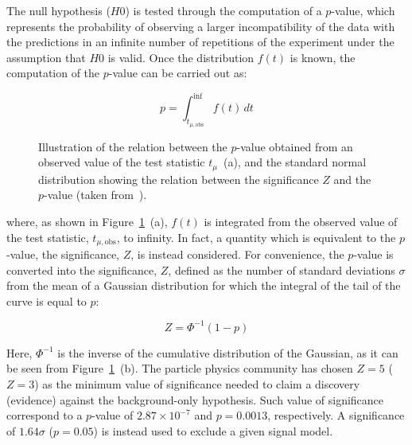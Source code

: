 			The null hypothesis ($H0$) is tested through the computation of a $p$-value, which represents the probability of observing a larger incompatibility of the data with the predictions in an infinite number of repetitions of the experiment under the assumption that $H0$ is valid. Once the distribution $f(t)$ is known, the computation of the $p$-value can be carried out as:

			\begin{equation}
				p = \int_{t_{\mu,\mathrm{obs}}}^{\inf} f(t)\,dt
 			\label{eq:pvalue}
			\end{equation}

			\begin{figure}[!htb]
				\centering
					\hspace{0.05\textwidth}
					\hspace{0.05\textwidth}
				\caption{Illustration of the relation between the $p$-value obtained from an observed value of the test statistic $t_{\mu}$~(a), and the standard normal distribution showing the relation between the significance $Z$ and the $p$-value (taken from~\cite{Cowan:2010js}).}
				\label{fig:pval-sig}
			\end{figure}

			\noindent where, as shown in Figure~\ref{fig:pval-sig}~(a), $f(t)$ is integrated from the observed value of the test statistic, $t_{\mu,\mathrm{obs}}$, to infinity. In fact, a quantity which is equivalent to the $p$-value, the significance, $Z$, is instead considered. For convenience, the $p$-value is converted into the significance, $Z$, defined as the number of standard deviations $\sigma$ from the mean of a Gaussian distribution for which the integral of the tail of the curve is equal to $p$: 

			\begin{equation}
				Z = \Phi^{-1} \left ( 1 - p \right )
			\label{eq:Z_pval}
			\end{equation}

			\noindent Here, $\Phi^{-1}$ is the inverse of the cumulative distribution of the Gaussian, as it can be seen from Figure~\ref{fig:pval-sig}~(b). The particle physics community has chosen $Z = 5$ ($Z=3$) as the minimum value of significance needed to claim a discovery (evidence) against the background-only hypothesis. Such value of significance correspond to a $p$-value of $2.87 \times 10^{-7}$ and $p = 0.0013$, respectively. A significance of $1.64\sigma$ ($p = 0.05$) is instead used to exclude a given signal model.

